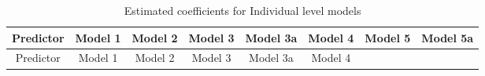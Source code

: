 \documentclass[12pt,twoside]{reedthesis}
\begin{document}
  \begin{longtable}[]{@{}cccccccc@{}}
  \caption{Estimated coefficients for Individual level models
  \label{tab:model_indiv_coefs}}\tabularnewline
  \toprule
  \begin{minipage}[b]{0.12\columnwidth}\centering\strut
  Predictor\strut
  \end{minipage} & \begin{minipage}[b]{0.09\columnwidth}\centering\strut
  Model 1\strut
  \end{minipage} & \begin{minipage}[b]{0.09\columnwidth}\centering\strut
  Model 2\strut
  \end{minipage} & \begin{minipage}[b]{0.09\columnwidth}\centering\strut
  Model 3\strut
  \end{minipage} & \begin{minipage}[b]{0.09\columnwidth}\centering\strut
  Model 3a\strut
  \end{minipage} & \begin{minipage}[b]{0.09\columnwidth}\centering\strut
  Model 4\strut
  \end{minipage} & \begin{minipage}[b]{0.09\columnwidth}\centering\strut
  Model 5\strut
  \end{minipage} & \begin{minipage}[b]{0.10\columnwidth}\centering\strut
  Model 5a\strut
  \end{minipage}\tabularnewline
  \midrule
  \endfirsthead
  \toprule
  \begin{minipage}[b]{0.12\columnwidth}\centering\strut
  Predictor\strut
  \end{minipage} & \begin{minipage}[b]{0.09\columnwidth}\centering\strut
  Model 1\strut
  \end{minipage} & \begin{minipage}[b]{0.09\columnwidth}\centering\strut
  Model 2\strut
  \end{minipage} & \begin{minipage}[b]{0.09\columnwidth}\centering\strut
  Model 3\strut
  \end{minipage} & \begin{minipage}[b]{0.09\columnwidth}\centering\strut
  Model 3a\strut
  \end{minipage} & \begin{minipage}[b]{0.09\columnwidth}\centering\strut
  Model 4\strut
  \end{minipage} & \begin{minipage}[b]{0.09\columnwidth}\centering\strut

\end{minipage}
\end{longtable}
\end{document}
